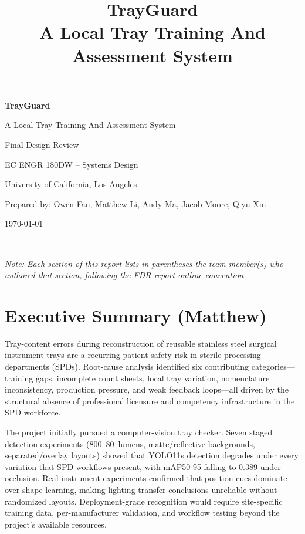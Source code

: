 \documentclass[10pt,a4paper]{article}
\title{TrayGuard\\A Local Tray Training And Assessment System}
\author{}
\date{}
\begin{document}
\begin{titlepage}
\centering
\vspace*{3cm}
{\Huge\bfseries TrayGuard\par}
\vspace{0.5cm}
{\Large A Local Tray Training And Assessment System\par}
\vspace{2cm}
{\large Final Design Review\par}
\vspace{1cm}
{\large EC ENGR 180DW -- Systems Design\par}
\vspace{0.5cm}
{\large University of California, Los Angeles\par}
\vspace{3cm}
{\large Prepared by: Owen Fan, Matthew Li, Andy Ma, Jacob Moore, Qiyu Xin\par}
\vspace{0.3cm}
{\large \today\par}
\vfill
\noindent\rule{\textwidth}{0.4pt}\\
\small{\textit{Note: Each section of this report lists in parentheses the team member(s) who authored that section, following the FDR report outline convention.}}
\end{titlepage}

\tableofcontents
\newpage






\section{Executive Summary \hfill {\normalfont\small (Matthew)}}
\label{sec:executive-summary}

Tray-content errors during reconstruction of reusable stainless steel surgical
instrument trays are a recurring patient-safety risk in sterile processing
departments (SPDs). Root-cause
analysis identified six contributing categories---training gaps, incomplete
count sheets, local tray variation, nomenclature inconsistency, production
pressure, and weak feedback loops---all driven by the structural absence of
professional licensure and competency infrastructure in the SPD workforce.

The project initially pursued a computer-vision tray checker. Seven staged
detection experiments (800--80~lumens, matte/reflective backgrounds,
separated/overlay layouts) showed that YOLO11s detection degrades under every
variation that SPD workflows present, with mAP50-95 falling to 0.389 under
occlusion. Real-instrument experiments confirmed that position cues dominate
over shape learning, making lighting-transfer conclusions unreliable without
randomized layouts. Deployment-grade recognition would require site-specific
training data, per-manufacturer validation, and workflow testing beyond the
project's available resources.
\end{document}
